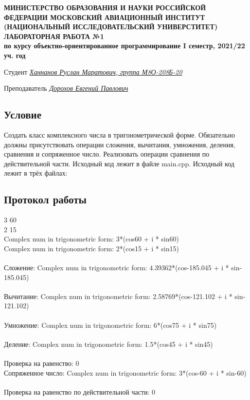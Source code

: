 \documentclass[12pt]{article}
\begin{document}
\begin{titlepage}
\begin{center}
\textbf{МИНИСТЕРСТВО ОБРАЗОВАНИЯ И НАУКИ РОССИЙСКОЙ ФЕДЕРАЦИИ
\medskip
МОСКОВСКИЙ АВИАЦИОННЫЙ ИНСТИТУТ
(НАЦИОНАЛЬНЫЙ ИССЛЕДОВАТЕЛЬСКИЙ УНИВЕРСТИТЕТ)
\vfill\vfill
{\Huge ЛАБОРАТОРНАЯ РАБОТА №1} \\
по курсу объектно-ориентированное программирование
I семестр, 2021/22 уч. год}
\end{center}
\vfill

Студент \uline{\it {Ханнанов Руслан Маратович, группа М8О-208Б-20}\hfill}

Преподаватель \uline{\it {Дорохов Евгений Павлович}\hfill}

\vfill
\end{titlepage}

\subsection*{Условие}
Создать класс комплексного числа в тригонометрической форме. Обязательно должны присутствовать операции сложения, вычитания, умножения, деления, сравнения и сопряженное число. Реализовать операции сравнения по действительной части. Исходный код лежит в файле main.cpp.
Исходный код лежит в трёх файлах:
\pagebreak
\subsection*{Протокол работы}
3 60 \\
2 15 \\
Complex num in trigonometric form: 3*(cos60 + i * sin60) \\
Complex num in trigonometric form: 2*(cos15 + i * sin15) \\
\\
Сложение: Complex num in trigonometric form: 4.39362*(cos-185.045 + i * sin-185.045) \\
\\
Вычитание: Complex num in trigonometric form: 2.58769*(cos-121.102 + i * sin-121.102) \\
\\
Умножение: Complex num in trigonometric form: 6*(cos75 + i * sin75) \\
\\
Деление: Complex num in trigonometric form: 1.5*(cos45 + i * sin45) \\
\\
Проверка на равенство: 0 \\
Сопряженное число: Complex num in trigonometric form: 3*(cos-60 + i * sin-60) \\
\\
Проверка на равенство по действительной части: 0 \\
\end{document}
